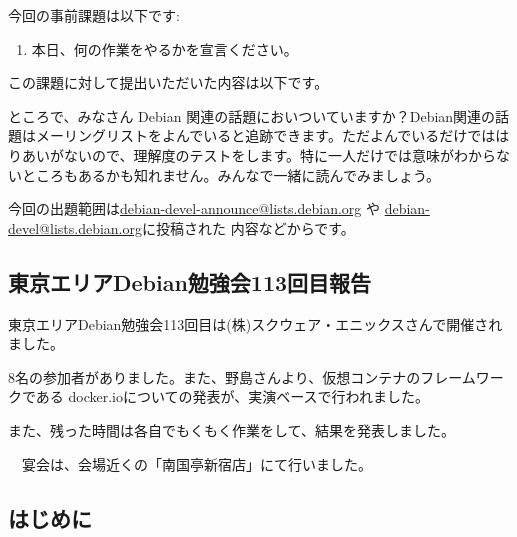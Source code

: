 \documentclass[mingoth,a4paper]{jsarticle}
\begin{document}

今回の事前課題は以下です:
\begin{enumerate}
 \item 本日、何の作業をやるかを宣言ください。
\end{enumerate}
この課題に対して提出いただいた内容は以下です。
\begin{multicols}{2}
{\small
 
}
\end{multicols}


ところで、みなさん Debian 関連の話題においついていますか？Debian関連の話
題はメーリングリストをよんでいると追跡できます。ただよんでいるだけではは
りあいがないので、理解度のテストをします。特に一人だけでは意味がわからな
いところもあるかも知れません。みんなで一緒に読んでみましょう。

今回の出題範囲は\url{debian-devel-announce@lists.debian.org} や \url{debian-devel@lists.debian.org}に投稿された
内容などからです。

\begin{multicols}{2}

\end{multicols}


\subsection{東京エリアDebian勉強会113回目報告}

 東京エリアDebian勉強会113回目は(株)スクウェア・エニックスさんで開催されました。

 8名の参加者がありました。また、野島さんより、仮想コンテナのフレームワークである
docker.ioについての発表が、実演ベースで行われました。
 
 また、残った時間は各自でもくもく作業をして、結果を発表しました。

　宴会は、会場近くの「南国亭新宿店」にて行いました。



\subsection{はじめに}
\end{document}
